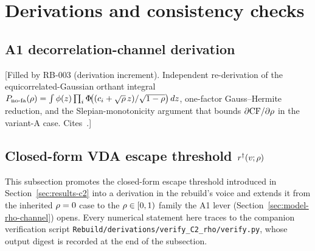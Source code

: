 %
%

\appendix
\section{Derivations and consistency checks}
\label{sec:appendix}

\subsection{A1 decorrelation-channel derivation}
\label{sec:appendix-deriv-a1}

[Filled by RB-003 (derivation increment). Independent re-derivation
of the equicorrelated-Gaussian orthant integral
$P_{\mathrm{no\text{-}fa}}(\rho) = \int \phi(z)\prod_i \Phi\!\big((c_i +
\sqrt{\rho}\,z)/\sqrt{1 - \rho}\big)\, dz$,
one-factor Gauss--Hermite reduction, and the Slepian-monotonicity
argument that bounds $\partial \mathrm{CF} / \partial \rho$ in the
variant-A case. Cites~\cite{Slepian1962}.]

\subsection{Closed-form VDA escape threshold $r^{\dagger}(v;\rho)$}
\label{sec:appendix-deriv-c2}

This subsection promotes the closed-form escape threshold introduced
in Section~\ref{sec:results-c2} into a derivation in the rebuild's
voice and extends it from the inherited $\rho = 0$ case to the
$\rho \in [0, 1)$ family the A1 lever
(Section~\ref{sec:model-rho-channel}) opens. Every numerical
statement here traces to the companion verification script
\texttt{Rebuild/derivations/verify\_C2\_rho/verify.py}, whose
output digest is recorded at the end of the subsection.

